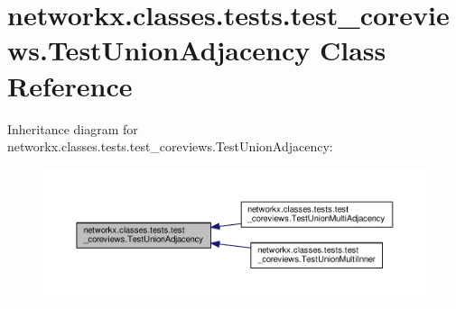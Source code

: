 \hypertarget{classnetworkx_1_1classes_1_1tests_1_1test__coreviews_1_1TestUnionAdjacency}{}\section{networkx.\+classes.\+tests.\+test\+\_\+coreviews.\+Test\+Union\+Adjacency Class Reference}
\label{classnetworkx_1_1classes_1_1tests_1_1test__coreviews_1_1TestUnionAdjacency}


Inheritance diagram for networkx.\+classes.\+tests.\+test\+\_\+coreviews.\+Test\+Union\+Adjacency\+:
\nopagebreak
\begin{figure}[H]
\begin{center}
\leavevmode
\includegraphics[width=350pt]{classnetworkx_1_1classes_1_1tests_1_1test__coreviews_1_1TestUnionAdjacency__inherit__graph}
\end{center}
\end{figure}
